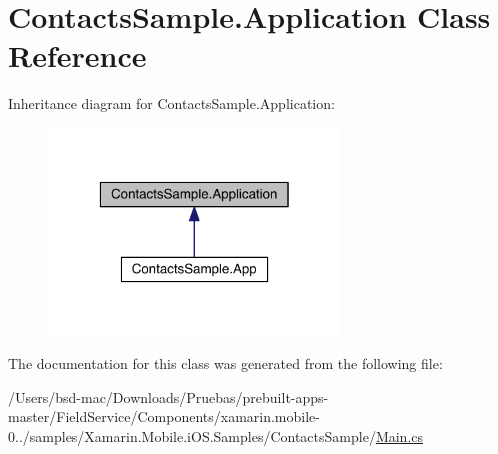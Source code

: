 \hypertarget{class_contacts_sample_1_1_application}{\section{Contacts\+Sample.\+Application Class Reference}
\label{class_contacts_sample_1_1_application}
}


Inheritance diagram for Contacts\+Sample.\+Application\+:
\nopagebreak
\begin{figure}[H]
\begin{center}
\leavevmode
\includegraphics[width=220pt]{class_contacts_sample_1_1_application__inherit__graph}
\end{center}
\end{figure}


The documentation for this class was generated from the following file\+:\begin{DoxyCompactItemize}
\item 
/\+Users/bsd-\/mac/\+Downloads/\+Pruebas/prebuilt-\/apps-\/master/\+Field\+Service/\+Components/xamarin.\+mobile-\/0../samples/\+Xamarin.\+Mobile.\+i\+O\+S.\+Samples/\+Contacts\+Sample/\hyperlink{_components_2xamarin_8mobile-0_86_81_2samples_2_xamarin_8_mobile_8i_o_s_8_samples_2_contacts_sample_2_main_8cs}{Main.\+cs}\end{DoxyCompactItemize}
